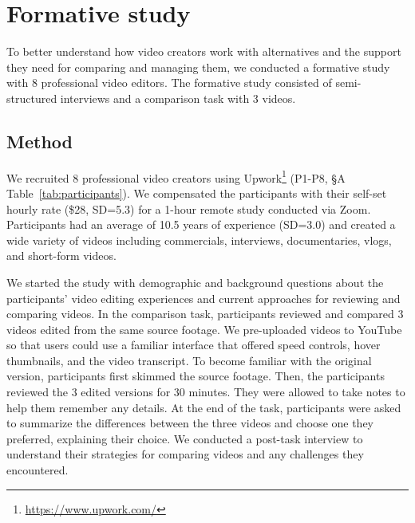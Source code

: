 \section{Formative study}
To better understand how video creators work with alternatives and the support they need for comparing and managing them, we conducted a formative study with 8 professional video editors. The formative study consisted of semi-structured interviews and a comparison task with 3 videos.

\subsection{Method}
We recruited 8 professional video creators using Upwork\footnote{\url{https://www.upwork.com/}} (P1-P8, \S{A} Table~\ref{tab:participants}). We compensated the participants with their self-set hourly rate (\$28, SD=5.3) for a 1-hour remote study conducted via Zoom. Participants had an average of 10.5 years of experience (SD=3.0) and created a wide variety of videos including commercials, interviews, documentaries, vlogs, and short-form videos.

We started the study with demographic and background questions about the participants' video editing experiences and current approaches for reviewing and comparing videos.
In the comparison task, participants reviewed and compared 3 videos edited from the same source footage. We pre-uploaded videos to YouTube so that users could use a familiar interface that offered speed controls, hover thumbnails, and the video transcript. 
To become familiar with the original version, participants first skimmed the source footage. Then, the participants reviewed the 3 edited versions for 30 minutes. 
They were allowed to take notes to help them remember any details. At the end of the task, participants were asked to summarize the differences between the three videos and choose one they preferred, explaining their choice. We conducted a post-task interview to understand their strategies for comparing videos and any challenges they encountered.

